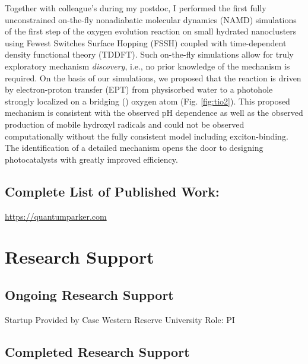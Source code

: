 \documentclass{nihbiosketch}
\begin{document}
\begin{enumerate}
  Together with colleague's during my postdoc, I performed the first fully unconstrained on-the-fly nonadiabatic molecular
  dynamics (NAMD) simulations of the first step of the oxygen evolution reaction on small hydrated  nanoclusters
  using Fewest Switches Surface Hopping (FSSH) coupled with time-dependent density functional theory
  (TDDFT).\cite{C6SC04378J} Such on-the-fly simulations allow for truly exploratory mechanism \emph{discovery}, i.e., no
  prior knowledge of the mechanism is required. On the basis of our simulations, we proposed that the reaction is driven by
  electron-proton transfer (EPT) from physisorbed water to a photohole strongly localized on a bridging ()
  oxygen atom (Fig. \ref{fig:tio2}). This proposed mechanism is consistent with the observed pH dependence as well as the
  observed production of mobile hydroxyl radicals and could not be observed computationally without the fully consistent
  model including exciton-binding. The identification of a detailed mechanism opens the door to designing photocatalysts
  with greatly improved efficiency.
\end{enumerate}

\subsection*{Complete List of Published Work:} 
\url{https://quantumparker.com}



\section{Research Support}

\subsection*{Ongoing Research Support}

{Startup}
{Provided by Case Western Reserve University}
{Role: PI}




\subsection*{Completed Research Support}
% 
\end{document}
